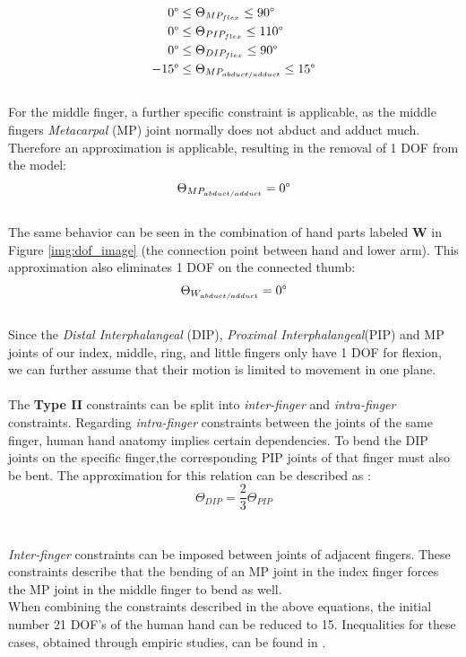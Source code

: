 \begin{equation}
\begin{split}
0\degree&\leq \Theta _{MP_{flex}} \leq 90\degree\\
0\degree&\leq \Theta _{PIP_{flex}} \leq 110\degree\\
0\degree&\leq \Theta _{DIP_{flex}} \leq 90\degree\\
-15\degree&\leq \Theta _{MP_{abduct/adduct}} \leq 15\degree
\end{split}
\end{equation}
\\For the middle finger, a further specific constraint is applicable, as the middle fingers \textit{Metacarpal} (MP) joint normally does not abduct and adduct much. Therefore an approximation is applicable, resulting in the removal of 1 DOF from the model:\\
\begin{equation}
\Theta _{MP_{abduct/adduct}}=0\degree
\end{equation}
\\The same behavior can be seen in the combination of hand parts labeled \textbf{W} in Figure \ref{img:dof_image} (the connection point between hand and lower arm). This approximation also eliminates 1 DOF on the connected thumb:\\
\begin{equation}
\Theta _{W_{abduct/adduct}}=0\degree
\end{equation}
\\Since the \textit{Distal Interphalangeal} (DIP), \textit{Proximal Interphalangeal}(PIP) and MP joints of our index, middle, ring, and little fingers only have 1 DOF for flexion, we can further assume that their motion is limited to movement in one plane. \\\\
The \textbf{Type II} constraints can be split into \textit{inter-finger} and\textit{ intra-finger} constraints.
Regarding \textit{intra-finger} constraints between the joints of the same finger, human hand anatomy implies certain dependencies. To bend the DIP joints on the specific finger,the corresponding PIP joints of that finger must also be bent.
The approximation for this relation \cite{Rijpkema.1991} can be described as :\\
\begin{equation}
\Theta _{DIP} =\frac{2}{3}\Theta _{PIP}
\end{equation}\\
\\\textit{Inter-finger} constraints can be imposed between joints of adjacent fingers. These constraints describe that the bending of an MP joint in the index finger forces the MP joint in the middle finger to bend as well.\\
When combining the constraints described in the above equations, the initial number 21 DOF's of the human hand can be reduced to 15. Inequalities for these cases, obtained through empiric studies, can be found in \citep{LEE.1995}.\\
